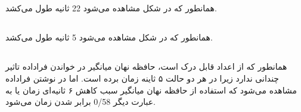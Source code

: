 \documentclass{article}
\begin{document}
\subsection{}
همانطور که در شکل مشاهده می‌شود 22 ثانیه طول می‌کشد.

\subsection{}
همانطور که در شکل مشاهده می‌شود 5 ثانیه طول می‌کشد.

\subsection{}
همانطور که از اعداد قابل درک است،‌ حافظه نهان میانگیر در خواندن فراداده 
تاثیر چندانی ندارد زیرا در هر دو حالت ۵ ثاینه زمان برده است. اما در نوشتن فراداده 
مشاهده می‌شود که استفاده از حافظه نهان میانگیر 
سبب کاهش ۶ ثانیه‌ای زمان یا به عبارت دیگر 
0/58
برابر شدن زمان می‌شود.

\section{}
\subsection{}
\subsection{}
\subsection{}
\subsection{}
\subsection{}
\end{document}
